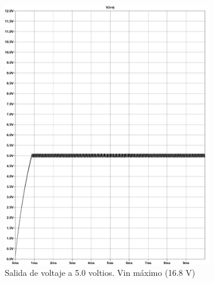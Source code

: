 \begin{figure}[h]
  \centering
  \begin{subfigure}{0.48\linewidth}
    \includegraphics[width=\textwidth]{Pictures/Convertidor DC-DC MC34063A, bus 5.0 v a 750 mA_page-0001 Max.jpg}
    \caption{Salida de voltaje a 5.0 voltios. Vin máximo (16.8 V)}
    \label{fig:4s1p_50v_2dcdcconverters_Max}
  \end{subfigure}
  \hfill
  \begin{subfigure}{0.48\linewidth}

\end{subfigure}
\end{figure}
